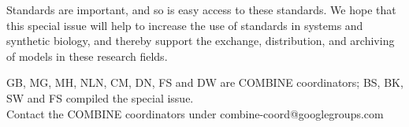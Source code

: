 \documentclass{jib}
\begin{document}
Standards are important, and so is easy access to these standards. We hope that this special issue will help to increase the use of standards in systems and synthetic biology, and thereby support the exchange, distribution, and archiving  of models in these research fields.

\vspace*{2cm}

GB, MG, MH, NLN, CM, DN, FS and DW are COMBINE coordinators; BS, BK, SW and FS compiled the special issue. \\
Contact the COMBINE coordinators under combine-coord@googlegroups.com



\end{document}
